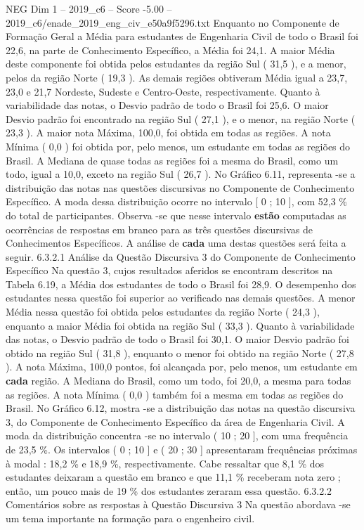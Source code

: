 \begin{textsample}{NEG Dim 1 – 2019\_c6 – Score -5.00 – 2019\_c6/enade\_2019\_eng\_civ\_e50a9f5296.txt}
Enquanto no Componente de Formação Geral a Média para estudantes de Engenharia Civil de todo o Brasil foi 22,6, na parte de Conhecimento Específico, a Média foi 24,1.
A maior Média deste componente foi obtida pelos estudantes da região Sul ( 31,5 ), e a menor, pelos da região Norte ( 19,3 ).
As demais regiões obtiveram Média igual a 23,7, 23,0 e 21,7 Nordeste, Sudeste e Centro-Oeste, respectivamente.
Quanto à variabilidade das notas, o Desvio padrão de todo o Brasil foi 25,6.
O maior Desvio padrão foi encontrado na região Sul ( 27,1 ), e o menor, na região Norte ( 23,3 ).
A maior nota Máxima, 100,0, foi obtida em todas as regiões.
A nota Mínima ( 0,0 ) foi obtida por, pelo menos, um estudante em todas as regiões do Brasil.
A Mediana de quase todas as regiões foi a mesma do Brasil, como um todo, igual a 10,0, exceto na região Sul ( 26,7 ).
No Gráfico 6.11, representa -se a distribuição das notas nas questões discursivas no Componente de Conhecimento Específico.
A moda dessa distribuição ocorre no intervalo [ 0 ; 10 ], com 52,3 \% do total de participantes.
Observa -se que nesse intervalo \textbf{estão} computadas as ocorrências de respostas em branco para as três questões discursivas de Conhecimentos Específicos.
A análise de \textbf{cada} uma destas questões será feita a seguir. 6.3.2.1 Análise da Questão Discursiva 3 do Componente de Conhecimento Específico Na questão 3, cujos resultados aferidos se encontram descritos na Tabela 6.19, a Média dos estudantes de todo o Brasil foi 28,9.
O desempenho dos estudantes nessa questão foi superior ao verificado nas demais questões.
A menor Média nessa questão foi obtida pelos estudantes da região Norte ( 24,3 ), enquanto a maior Média foi obtida na região Sul ( 33,3 ).
Quanto à variabilidade das notas, o Desvio padrão de todo o Brasil foi 30,1.
O maior Desvio padrão foi obtido na região Sul ( 31,8 ), enquanto o menor foi obtido na região Norte ( 27,8 ).
A nota Máxima, 100,0 pontos, foi alcançada por, pelo menos, um estudante em \textbf{cada} região.
A Mediana do Brasil, como um todo, foi 20,0, a mesma para todas as regiões.
A nota Mínima ( 0,0 ) também foi a mesma em todas as regiões do Brasil.
No Gráfico 6.12, mostra -se a distribuição das notas na questão discursiva 3, do Componente de Conhecimento Específico da área de Engenharia Civil.
A moda da distribuição concentra -se no intervalo ( 10 ; 20 ], com uma frequência de 23,5 \%.
Os intervalos ( 0 ; 10 ] e ( 20 ; 30 ] apresentaram frequências próximas à modal : 18,2 \% e 18,9 \%, respectivamente.
Cabe ressaltar que 8,1 \% dos estudantes deixaram a questão em branco e que 11,1 \% receberam nota zero ; então, um pouco mais de 19 \% dos estudantes zeraram essa questão. 6.3.2.2 Comentários sobre as respostas à Questão Discursiva 3 Na questão abordava -se um tema importante na formação para o engenheiro civil.

\end{textsample}
